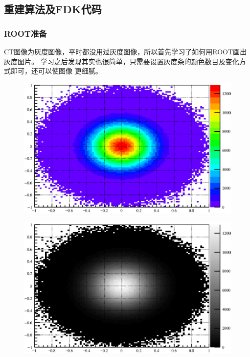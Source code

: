 \documentclass{beamer}
\newcommand{\liuhao}{\fontsize{7.875pt}{\baselineskip}\selectfont}
\begin{document}
\begin{CJK*}{UTF8}{gkai}
  \section{重建算法及FDK代码}
  \begin{frame}\frametitle{ROOT准备}
    \begin{minipage}[t]{0.5\textwidth}
      \vskip 0.5cm
      \liuhao
      CT图像为灰度图像，平时都没用过灰度图像，所以首先学习了如何用ROOT画出灰度图片。
      学习之后发现其实也很简单，只需要设置灰度条的颜色数目及变化方式即可，还可以使图像
      更细腻。
      \vskip 0.5cm
      \begin{figure}[ht]
	\includegraphics[width=\textwidth]{Test.eps}
      \end{figure}
    \end{minipage}
    \pause
    \begin{minipage}[t]{0.5\textwidth}
      \begin{figure}[ht]
	\includegraphics[width=\textwidth]{TestGrayStyle.eps}


\end{figure}
\end{minipage}
\end{frame}
\end{CJK*}
\end{document}

